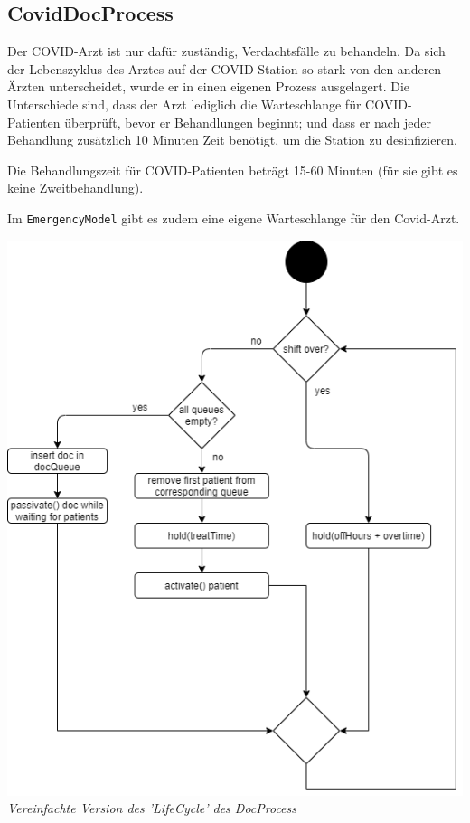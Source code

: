 \documentclass{article}
\begin{document}
\subsection{CovidDocProcess}

Der COVID-Arzt ist nur dafür zuständig, Verdachtsfälle zu behandeln.
Da sich der Lebenszyklus des Arztes auf der COVID-Station so stark von den anderen Ärzten unterscheidet,
wurde er in einen eigenen Prozess ausgelagert.
Die Unterschiede sind, dass der Arzt lediglich die Warteschlange für COVID-Patienten überprüft, bevor er Behandlungen beginnt; und dass er nach jeder Behandlung zusätzlich 10 Minuten Zeit benötigt, um die Station zu desinfizieren.

Die Behandlungszeit für COVID-Patienten beträgt 15-60 Minuten (für sie gibt es keine Zweitbehandlung).

Im \texttt{EmergencyModel} gibt es zudem eine eigene Warteschlange für den Covid-Arzt.

\includegraphics[scale=0.6]{img/docProcess.png} \\
\textit{Vereinfachte Version des 'LifeCycle' des DocProcess}
\end{document}
